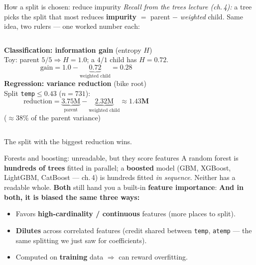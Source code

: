 \documentclass[aspectratio=169]{beamer}
\begin{document}
\begin{frame}{How a split is chosen: reduce impurity}
  \emph{Recall from the trees lecture (ch.\,4):} a tree picks the split that most reduces
  \textbf{impurity} $=$ parent $-$ \emph{weighted} child. Same idea, two rulers --- one worked number each:
  \vskip 6pt
  \begin{columns}[T]
    \textbf{Classification: information gain} (entropy $H$) \\[2pt]
    \footnotesize Toy: parent $5/5 \Rightarrow H=1.0$; a $4/1$ child has $H=0.72$.
    \[ \text{gain} = 1.0 - \underbrace{0.72}_{\text{weighted child}} = \mathbf{0.28} \]
    \textbf{Regression: variance reduction} (bike root) \\[2pt]
    \footnotesize Split \texttt{temp}$\le 0.43$ ($n=731$):
    \[ \text{reduction} = \underbrace{3.75\text{M}}_{\text{parent}} - \underbrace{2.32\text{M}}_{\text{weighted child}} \approx \mathbf{1.43\text{M}} \]
    \centering ($\approx 38\%$ of the parent variance)
  \end{columns}
  \vskip 6pt
  \footnotesize The split with the biggest reduction wins.
\end{frame}

\begin{frame}{Forests and boosting: unreadable, but they score features}
  A random forest is \textbf{hundreds of trees} fitted in parallel; a \textbf{boosted} model
  (GBM, XGBoost, LightGBM, CatBoost --- ch.\,4) is hundreds fitted \emph{in sequence}. Neither has
  a readable whole. \textbf{Both} still hand you a built-in \textbf{feature importance}:
  \vfill
  \vfill
  \textbf{And in both, it is biased the same three ways:}
  \begin{itemize}\small
    \item Favors \textbf{high-cardinality / continuous} features (more places to split).
    \item \textbf{Dilutes} across correlated features (credit shared between \texttt{temp},
      \texttt{atemp} --- the same splitting we just saw for coefficients).
    \item Computed on \textbf{training} data $\Rightarrow$ can reward overfitting.
  \end{itemize}
\end{frame}
\end{document}
